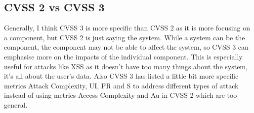 \documentclass[12pt]{article}
\begin{document}
\subsection{CVSS 2 vs CVSS 3}

Generally, I think CVSS 3 is more specific than CVSS 2 as it is more focusing on a component, but CVSS 2 is just saying the system. While a system can be the component, the component may not be able to affect the system, so CVSS 3 can emphasise more on the impacts of the individual component. This is especially useful for attacks like XSS as it doesn't have too many things about the system, it's all about the user's data. Also CVSS 3 has listed a little bit more specific metrics Attack Complexity, UI, PR and S to address different types of attack instead of using metrics Access Complexity and Au in CVSS 2 which are too general.
\end{document}
